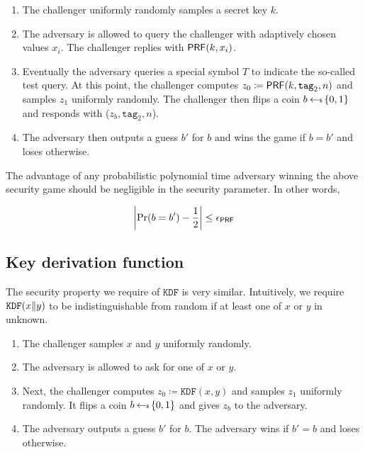 \documentclass[12pt]{article}
\begin{document}
\begin{enumerate}
\item The challenger uniformly randomly samples a secret key $k$.

\item The adversary is allowed to query the challenger with adaptively chosen values $x_i$. The challenger replies with $\mathsf{PRF}(k, x_i)$.

\item Eventually the adversary queries a special symbol $T$ to indicate the so-called test query. At this point, the challenger computes $z_0 \coloneqq \mathsf{PRF}(k, \texttt{tag}_2, n)$ and samples $z_1$ uniformly randomly. The challenger then flips a coin $b \hskip2.3pt{\gets\!\!\mbox{\tiny${\$}$\normalsize}}\, \{0, 1\}$ and responds with ($z_b, \texttt{tag}_2, n$). 

\item The adversary then outputs a guess $b'$ for $b$ and wins the game if $b = b'$ and loses otherwise.
\end{enumerate}

The advantage of any probabilistic polynomial time adversary winning the above security game should be negligible in the security parameter. In other words,

$$
\left \vert \Pr(b = b') - \frac{1}{2} \right \vert \le \epsilon_{\mathsf{PRF}}
$$

\subsection{Key derivation function} \label{KDFdef}
The security property we require of $\texttt{KDF}$ is very similar. Intuitively, we require $\texttt{KDF}(x \| y)$ to be indistinguishable from random if at least one of $x$ or $y$ in unknown.

\begin{enumerate}
\item The challenger samples $x$ and $y$ uniformly randomly.

\item The adversary is allowed to ask for one of $x$ or $y$.

\item Next, the challenger computes $z_0 \coloneqq \texttt{KDF}(x, y)$ and samples $z_1$ uniformly randomly. It flips a coin $b \hskip2.3pt{\gets\!\!\mbox{\tiny${\$}$\normalsize}}\, \{0, 1 \}$ and gives $z_b$ to the adversary.

\item The adversary outputs a guess $b'$ for $b$. The adversary wins if $b' = b$ and loses otherwise.
\end{enumerate}
\end{document}
